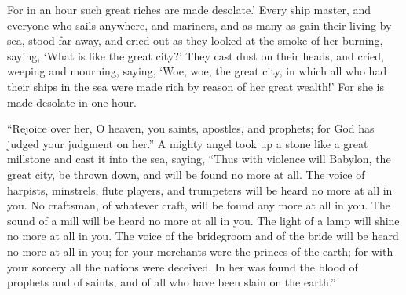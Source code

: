 {For in an hour such great riches are made desolate.’ Every ship master, and everyone who sails anywhere, and mariners, and as many as gain their living by sea, stood far away,
and cried out as they looked at the smoke of her burning, saying, ‘What is like the great city?’
They cast dust on their heads, and cried, weeping and mourning, saying, ‘Woe, woe, the great city, in which all who had their ships in the sea were made rich by reason of her great wealth!’ For she is made desolate in one hour.
\par }{\PP {}“Rejoice over her, O heaven, you saints, apostles, and prophets; for God has judged your judgment on her.”
A mighty angel took up a stone like a great millstone and cast it into the sea, saying, “Thus with violence will Babylon, the great city, be thrown down, and will be found no more at all.
The voice of harpists, minstrels, flute players, and trumpeters will be heard no more at all in you. No craftsman, of whatever craft, will be found any more at all in you. The sound of a mill will be heard no more at all in you.
The light of a lamp will shine no more at all in you. The voice of the bridegroom and of the bride will be heard no more at all in you; for your merchants were the princes of the earth; for with your sorcery all the nations were deceived.
In her was found the blood of prophets and of saints, and of all who have been slain on the earth.”

}
